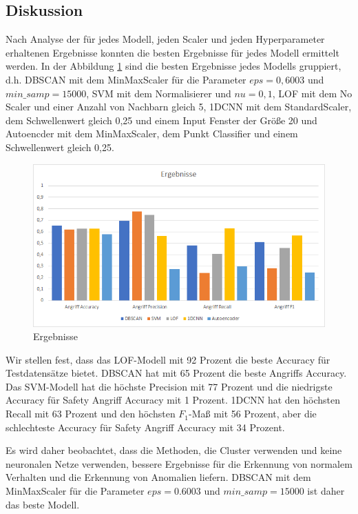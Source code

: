 \documentclass[12pt,a4paper]{scrartcl}
\numberwithin{equation}{section}
\begin{document}
\subsection{Diskussion}

Nach Analyse der für jedes Modell, jeden Scaler und jeden Hyperparameter erhaltenen Ergebnisse konnten die besten Ergebnisse für jedes Modell ermittelt werden. In der Abbildung \ref{ergebnis} sind die besten Ergebnisse jedes Modells gruppiert, d.h. DBSCAN mit dem MinMaxScaler für die Parameter $eps = 0,6003$ und $min\_samp = 15000$, SVM mit dem Normalisierer und $nu = 0,1$, LOF mit dem No Scaler und einer Anzahl von Nachbarn gleich 5, 1DCNN mit dem StandardScaler, dem Schwellenwert gleich 0,25 und einem Input Fenster der Größe 20 und Autoencder mit dem MinMaxScaler, dem Punkt Classifier und einem Schwellenwert gleich 0,25. 

\begin{figure}[ht!]
	\centering
	  \includegraphics[scale=0.7]{ergebnis.png}
	  \caption{Ergebnisse}
	\label{ergebnis}
\end{figure}

Wir stellen fest, dass das LOF-Modell mit 92 Prozent die beste Accuracy für Testdatensätze bietet. DBSCAN hat mit 65 Prozent die beste Angriffs Accuracy. Das SVM-Modell hat die höchste Precision mit 77 Prozent und die niedrigste Accuracy für Safety Angriff Accuracy mit 1 Prozent. 1DCNN hat den höchsten Recall mit 63 Prozent und den höchsten $F_{1}$-Maß mit 56 Prozent, aber die schlechteste Accuracy für Safety Angriff Accuracy mit 34 Prozent. 

Es wird daher beobachtet, dass die Methoden, die Cluster verwenden und keine neuronalen Netze verwenden, bessere Ergebnisse für die Erkennung von normalem Verhalten und die Erkennung von Anomalien liefern. DBSCAN mit dem MinMaxScaler für die Parameter $eps = 0.6003$ und $min\_samp = 15000$ ist daher das beste Modell. 
\end{document}
